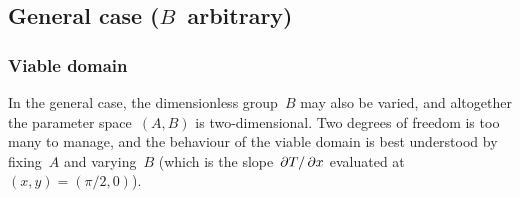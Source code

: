 \subsection{General case (\texorpdfstring{$B$~arbitrary}{B arbitrary})}
\label{sec:cartesian.cosine.general}

\subsubsection{Viable domain}
\label{sec:cartesian.cosine.general.viable}

In the general case, the dimensionless group~$B$ may also be varied,
and altogether the parameter space~$(A, B)$ is two-dimensional.
Two degrees of freedom is too many to manage,
and the behaviour of the viable domain is best understood
by fixing~$A$ and varying~$B$
(which is the slope~$\mathop{}\!\partial T / \mathop{}\!\partial x$ evaluated at~$(x, y) = (\pi/2, 0)$).

